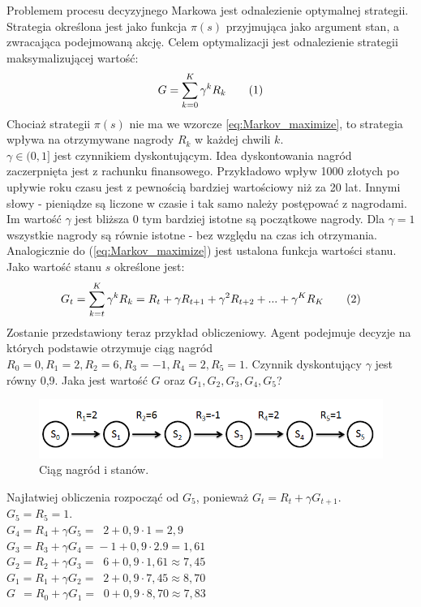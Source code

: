 \documentclass[12pt]{book}
\theoremstyle{plain}
\newcommand\addtag{\refstepcounter{equation}
\renewcommand{\labelenumii}{\theenumii}
\renewcommand{\theenumii}{\theenumi.\arabic{enumii}.}
\tag{\theequation}}
\begin{document}
Problemem procesu decyzyjnego Markowa jest odnalezienie optymalnej strategii. Strategia określona jest jako funkcja $\pi(s)$ przyjmująca jako argument stan, a zwracająca podejmowaną akcję. Celem optymalizacji jest odnalezienie strategii maksymalizującej wartość:
\[
G=\sum_{k=0}^{K} \gamma^k R_{k} \addtag \label{eq:Markov_maximize}
\]
Chociaż strategii $\pi(s)$ nie ma we wzorcze \ref{eq:Markov_maximize}, to strategia wpływa na otrzymywane nagrody $R_{k}$ w każdej chwili $k$.\\
$\gamma \in (0,1]$ jest czynnikiem dyskontującym. Idea dyskontowania nagród zaczerpnięta jest z rachunku finansowego. Przykładowo wpływ 1000 złotych po upływie roku czasu jest z pewnością bardziej wartościowy niż za 20 lat. Innymi słowy - pieniądze są liczone w czasie i tak samo należy postępować z nagrodami. Im wartość $\gamma$ jest bliższa 0 tym bardziej istotne są początkowe nagrody. Dla $\gamma=1$ wszystkie nagrody są równie istotne - bez względu na czas ich otrzymania.\\
Analogicznie do (\ref{eq:Markov_maximize}) jest ustalona funkcja wartości stanu. Jako wartość stanu $s$ określone jest:
\[
G_t=\sum_{k=t}^{K} \gamma^k R_{k}=R_{t}+\gamma R_{t+1}+\gamma^{2} R_{t+2}+...+\gamma^{K}R_K \addtag \label{eq:Markov_state_value_G}
\]
Zostanie przedstawiony teraz przykład obliczeniowy. Agent podejmuje decyzje na których podstawie otrzymuje ciąg  nagród $R_0=0, R_1=2,R_2=6,R_3=-1,R_4=2,R_5=1$. Czynnik dyskontujący $\gamma$ jest równy 0,9. Jaka jest wartość $G$ oraz $G_1,G_2,G_3,G_4,G_5$?\\
\begin{figure}[H]
  \centering
    \includegraphics[width=14cm]{rewards-graph}
 \caption{Ciąg nagród i stanów.}
 \label{fig:agent-srodowisko}
\end{figure}\noindent
Najłatwiej obliczenia rozpocząć od $G_5$, ponieważ
$G_{t}=R_{t}+\gamma G_{t+1}$.\\
$G_5=R_5=1$.\\
$G_4=R_4+\gamma G_{5}=\;\;2+0,9\cdot 1=2,9$\\
$G_3=R_3+\gamma G_{4}=\!-1+0,9\cdot2.9=1,61$\\
$G_2=R_2+\gamma G_{3}=\;\;6+0,9\cdot1,61 \approx 7,45$\\
$G_1=R_1+\gamma G_{2}=\;\;2+0,9\cdot 7,45 \approx 8,70$\\
$G\;\,=R_0+\gamma G_{1}=\;\;0+0,9\cdot 8,70 \approx 7,83$\\
\end{document}
